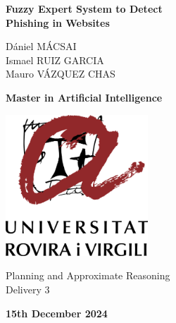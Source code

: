 \documentclass[11pt]{article}
\begin{document}
\begin{titlepage}
    \centering
    \vspace*{2cm}
    
    
    {\Huge\bfseries Fuzzy Expert System to Detect \\ Phishing in Websites\par}
    \vspace{1cm}
    
    \vspace{2cm}
    
    {\large
    Dániel MÁCSAI \\ 
    Ismael RUIZ GARCIA \\ 
    Mauro VÁZQUEZ CHAS
    \par}
    
    \vspace{2cm}
    
    {\large
    \textbf{Master in Artificial Intelligence}
    \par}
    
    \includegraphics[width=0.4\textwidth]{Logo_URV.png}\par\vspace{1cm}

    \vspace{1cm}

    {\large
    Planning and Approximate Reasoning\\
    Delivery 3
    \par}
    
    \vspace{1cm}
    
    {\large\bfseries 15th December 2024\par}
    
\end{titlepage}


\newpage
\end{document}
